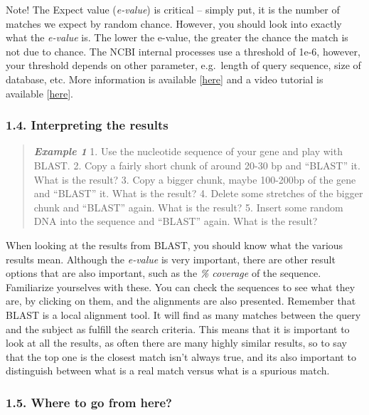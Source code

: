 \documentclass[]{article}
\begin{document}
Note! The Expect value (\emph{e-value}) is critical -- simply put, it is
the number of matches we expect by random chance. However, you should
look into exactly what the \emph{e-value} is. The lower the e-value, the
greater the chance the match is not due to chance. The NCBI internal
processes use a threshold of 1e-6, however, your threshold depends on
other parameter, e.g.~length of query sequence, size of database, etc.
More information is available
{[}\href{http://www.ncbi.nlm.nih.gov/BLAST/blastcgihelp.shtml\#expect}{here}{]}
and a video tutorial is available
{[}\href{https://www.youtube.com/watch?v=nO0wJgZRZJs}{here}{]}.

\subsubsection{1.4. Interpreting the
results}\label{interpreting-the-results}

\begin{quote}
\emph{\textbf{Example 1}} 1. Use the nucleotide sequence of your gene
and play with BLAST. 2. Copy a fairly short chunk of around 20-30 bp and
``BLAST'' it. What is the result? 3. Copy a bigger chunk, maybe
100-200bp of the gene and ``BLAST'' it. What is the result? 4. Delete
some stretches of the bigger chunk and ``BLAST'' again. What is the
result? 5. Insert some random DNA into the sequence and ``BLAST'' again.
What is the result?
\end{quote}

When looking at the results from BLAST, you should know what the various
results mean. Although the \emph{e-value} is very important, there are
other result options that are also important, such as the \emph{\%
coverage} of the sequence. Familiarize yourselves with these. You can
check the sequences to see what they are, by clicking on them, and the
alignments are also presented. Remember that BLAST is a local alignment
tool. It will find as many matches between the query and the subject as
fulfill the search criteria. This means that it is important to look at
all the results, as often there are many highly similar results, so to
say that the top one is the closest match isn't always true, and its
also important to distinguish between what is a real match versus what
is a spurious match.

\subsubsection{1.5. Where to go from here?}\label{where-to-go-from-here}
\end{document}
